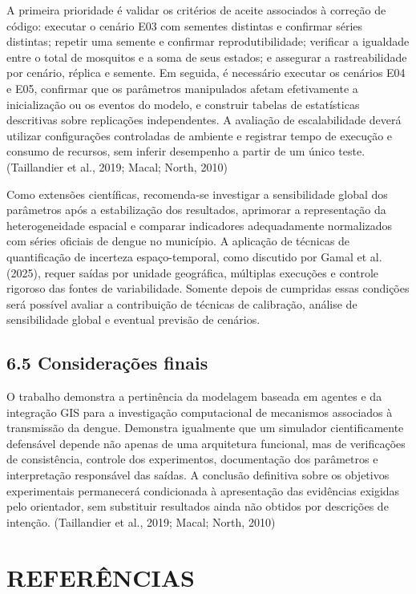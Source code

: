 A primeira prioridade é validar os critérios de aceite associados à
correção de código: executar o cenário E03 com sementes distintas e
confirmar séries distintas; repetir uma semente e confirmar
reprodutibilidade; verificar a igualdade entre o total de mosquitos e a
soma de seus estados; e assegurar a rastreabilidade por cenário, réplica
e semente. Em seguida, é necessário executar os cenários E04 e E05,
confirmar que os parâmetros manipulados afetam efetivamente a
inicialização ou os eventos do modelo, e construir tabelas de
estatísticas descritivas sobre replicações independentes. A avaliação de
escalabilidade deverá utilizar configurações controladas de ambiente e
registrar tempo de execução e consumo de recursos, sem inferir
desempenho a partir de um único teste. (Taillandier et al., 2019; Macal;
North, 2010)

Como extensões científicas, recomenda-se investigar a sensibilidade
global dos parâmetros após a estabilização dos resultados, aprimorar a
representação da heterogeneidade espacial e comparar indicadores
adequadamente normalizados com séries oficiais de dengue no município. A
aplicação de técnicas de quantificação de incerteza espaço-temporal,
como discutido por Gamal et al. (2025), requer saídas por unidade
geográfica, múltiplas execuções e controle rigoroso das fontes de
variabilidade. Somente depois de cumpridas essas condições será possível
avaliar a contribuição de técnicas de calibração, análise de
sensibilidade global e eventual previsão de cenários.

\subsection{6.5 Considerações finais}\label{considerauxe7uxf5es-finais}

O trabalho demonstra a pertinência da modelagem baseada em agentes e da
integração GIS para a investigação computacional de mecanismos
associados à transmissão da dengue. Demonstra igualmente que um
simulador cientificamente defensável depende não apenas de uma
arquitetura funcional, mas de verificações de consistência, controle dos
experimentos, documentação dos parâmetros e interpretação responsável
das saídas. A conclusão definitiva sobre os objetivos experimentais
permanecerá condicionada à apresentação das evidências exigidas pelo
orientador, sem substituir resultados ainda não obtidos por descrições
de intenção. (Taillandier et al., 2019; Macal; North, 2010)

\section{REFERÊNCIAS}\label{referuxeancias}

